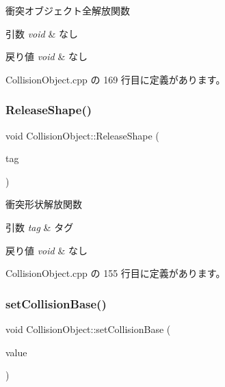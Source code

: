 衝突オブジェクト全解放関数 


\begin{DoxyParams}{引数}
{\em void} & なし \\
\hline
\end{DoxyParams}

\begin{DoxyRetVals}{戻り値}
{\em void} & なし \\
\hline
\end{DoxyRetVals}


 Collision\+Object.\+cpp の 169 行目に定義があります。

\mbox{\label{class_collision_object_a0befc2a8eeb87abe7c9e944c80335e81}} 
\subsubsection{\texorpdfstring{Release\+Shape()}{ReleaseShape()}}
{\footnotesize\ttfamily void Collision\+Object\+::\+Release\+Shape (\begin{DoxyParamCaption}\item[{int}]{tag }\end{DoxyParamCaption})}



衝突形状解放関数 


\begin{DoxyParams}{引数}
{\em tag} & タグ \\
\hline
\end{DoxyParams}

\begin{DoxyRetVals}{戻り値}
{\em void} & なし \\
\hline
\end{DoxyRetVals}


 Collision\+Object.\+cpp の 155 行目に定義があります。

\mbox{\label{class_collision_object_aa2479b3ce56f1d1a784c86f390fa2e74}} 
\subsubsection{\texorpdfstring{set\+Collision\+Base()}{setCollisionBase()}}
{\footnotesize\ttfamily void Collision\+Object\+::set\+Collision\+Base (\begin{DoxyParamCaption}\item[{\mbox{\hyperlink{class_collision_base}{Collision\+Base}} $\ast$}]{value }\end{DoxyParamCaption})}



